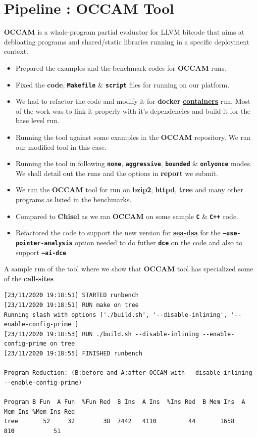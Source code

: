 \documentclass{article} %
\begin{document}
\section*{\color{darkmidnightblue} Pipeline : OCCAM Tool} 
\textbf{OCCAM} is a whole-program partial evaluator for LLVM bitcode that aims at debloating programs and shared/static libraries running in a specific deployment context.
\begin{itemize}
	\item Prepared the examples and the benchmark codes for \textbf{OCCAM} runs. 
	\item Fixed the \textbf{code}, \textbf{\texttt{Makefile}} \& \textbf{\texttt{script}} files for running on our platform. 
	\item We had to refactor the code and modify it for \textbf{docker} \textbf{\href{https://hub.docker.com/r/prodrelworks/occam10}{containers}} run. Most of the work was to link it properly with it's dependencies and build it for the base level run. 
	\item Running the tool against some examples in the \textbf{OCCAM} repository. We ran our modified tool in this case.
	\item Running the tool in following \textbf{\texttt{none}}, \textbf{\texttt{aggressive}}, \textbf{\texttt{bounded}} \& \textbf{\texttt{onlyonce}} modes. 
	We shall detail out the runs and the options in \textbf{report} we submit.  
	\item We ran the \textbf{OCCAM} tool for run on \textbf{bzip2}, \textbf{httpd}, \textbf{tree} and many other programs as listed in the benchmarks.
	\item Compared to \textbf{Chisel} as we ran \textbf{OCCAM} on some sample \textbf{\texttt{C}} \& \textbf{\texttt{C++}} code.
	\item Refactored the code to support the new version for \textbf{\href{https://github.com/seahorn/sea-dsa}{sea-dsa}} for the \textbf{\texttt{--use-pointer-analysis}} option needed to do futher \textbf{\texttt{dce}} on the code and also to support \textbf{\texttt{--ai-dce}}
\end{itemize}

A sample run of the tool where we show that \textbf{OCCAM} tool has specialized some of the \textbf{\color{ao(english)} call-sites} 
\begin{lstlisting}
[23/11/2020 19:18:51] STARTED runbench
[23/11/2020 19:18:51] RUN make on tree
Running slash with options ['./build.sh', '--disable-inlining', '--enable-config-prime']
[23/11/2020 19:18:53] RUN ./build.sh --disable-inlining --enable-config-prime on tree
[23/11/2020 19:18:55] FINISHED runbench

Program Reduction: (B:before and A:after OCCAM with --disable-inlining --enable-config-prime)

Program B Fun  A Fun  %Fun Red  B Ins  A Ins  %Ins Red  B Mem Ins  A Mem Ins %Mem Ins Red
tree       52     32        38  7442   4110         44       1658        810           51
\end{lstlisting}
\end{document}
